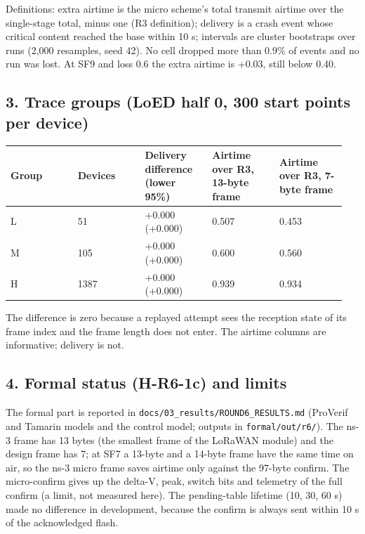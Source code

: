 Definitions: extra airtime is the micro scheme's total transmit airtime over the single-stage total, minus one (R3 definition); delivery is a crash event whose critical content reached the base within 10 s; intervals are cluster bootstraps over runs (2,000 resamples, seed 42). No cell dropped more than 0.9\% of events and no run was lost. At SF9 and loss 0.6 the extra airtime is +0.03, still below 0.40.

\subsection*{3. Trace groups (LoED half 0, 300 start points per device)}

{\scriptsize\raggedright
\begin{longtable}{p{0.190\linewidth}p{0.190\linewidth}p{0.190\linewidth}p{0.190\linewidth}p{0.190\linewidth}}
\toprule
Group & Devices & Delivery difference (lower 95\%) & Airtime over R3, 13-byte frame & Airtime over R3, 7-byte frame \\
\midrule
\endhead
L & 51 & +0.000 (+0.000) & 0.507 & 0.453 \\
M & 105 & +0.000 (+0.000) & 0.600 & 0.560 \\
H & 1387 & +0.000 (+0.000) & 0.939 & 0.934 \\
\bottomrule
\end{longtable}}

The difference is zero because a replayed attempt sees the reception state of its frame index and the frame length does not enter. The airtime columns are informative; delivery is not.

\subsection*{4. Formal status (H-R6-1c) and limits}

The formal part is reported in \texttt{docs/03\_results/ROUND6\_RESULTS.md} (ProVerif and Tamarin models and the control model; outputs in \texttt{formal/out/r6/}). The ns-3 frame has 13 bytes (the smallest frame of the LoRaWAN module) and the design frame has 7; at SF7 a 13-byte and a 14-byte frame have the same time on air, so the ns-3 micro frame saves airtime only against the 97-byte confirm. The micro-confirm gives up the delta-V, peak, switch bits and telemetry of the full confirm (a limit, not measured here). The pending-table lifetime (10, 30, 60 s) made no difference in development, because the confirm is always sent within 10 s of the acknowledged flash.

